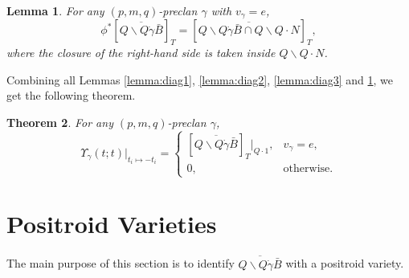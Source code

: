 \documentclass[12pt,reqno]{amsart}
\numberwithin{equation}{section}
\newtheorem{theorem}{Theorem}[section]
\newtheorem{lemma}[theorem]{Lemma}
\theoremstyle{definition}
\begin{document}
\begin{lemma}\label{lemma:diag4}
For any $(p,m,q)$-preclan $\gamma$ with $v_\gamma=e$, 
$$\phi^*[\overline{Q\backslash Q\dot{\gamma}\bar{B}}]_T
= [\overline{Q\backslash Q\dot{\gamma}\bar{B}\cap Q\backslash Q\cdot N}]_T,$$
where the closure of the right-hand side is taken inside $Q\backslash Q\cdot N$. %
\end{lemma}

Combining all 
Lemmas \ref{lemma:diag1}, \ref{lemma:diag2}, 
\ref{lemma:diag3} and 
\ref{lemma:diag4}, we get the following theorem. 

\begin{theorem}\label{thm:globalization}
For any $(p,m,q)$-preclan $\gamma$, 
$$\Upsilon_\gamma(t;t)
|_{t_i\mapsto -t_i}
= \begin{cases}
[\overline{Q\backslash Q\dot{\gamma}\bar{B}}]_T|_{Q\cdot 1}, & v_\gamma = e,\\
0, & \text{otherwise}.
\end{cases}
$$
\end{theorem}


\section{Positroid Varieties}\label{Positroid Varieties}

The main purpose of this section is to identify $\overline{Q\backslash Q\dot{\gamma}\bar{B}}$ with a positroid variety. 
\end{document}
